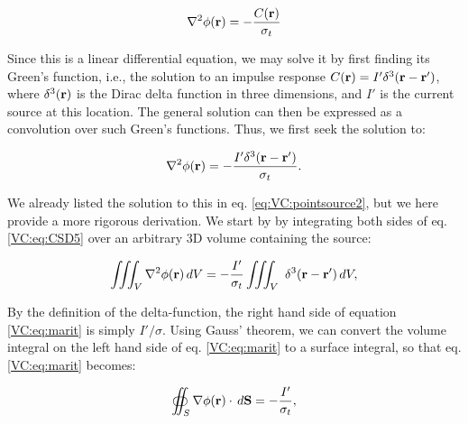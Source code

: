 \begin{equation}
\nabla^2 \phi({\bf r}) = - \frac{C({\bf r})}{\sigma_t}
\label{VC:eq:CSD4}
\end{equation}

Since this is a linear differential equation, we may solve it by first finding its Green's function, i.e., the solution to an impulse response $C({\bf r}) = I' \delta^3({\bf r-r'})$, 
where $\delta^3({\bf r})$ is the Dirac delta function in three dimensions, and $I'$ is the current source at this location. The general solution can then be expressed as a convolution over such Green's functions. Thus, we first seek the solution to: 

\begin{equation}
\nabla^2 \phi({\bf r}) = - \frac{I' \delta^3({\bf r-r'})}{\sigma_t}.
\label{VC:eq:CSD5}
\end{equation}

We already listed the solution to this in eq. \ref{eq:VC:pointsource2}, but we here provide a more rigorous derivation. We start by by integrating both sides of eq. \ref{VC:eq:CSD5} over an arbitrary 3D volume containing the source:

\begin{equation}
\iiint_V \nabla^2\phi({\bf r}) \,dV =  - \frac{I'}{\sigma_t} \iiint_V \ \delta^3({\bf r-r'}) \, dV,
\label{VC:eq:marit}
\end{equation}

By the definition of the delta-function, the right hand side of equation \ref{VC:eq:marit} is simply $I'/\sigma$. Using Gauss' theorem, we can convert the volume integral on the left hand side of eq. \ref{VC:eq:marit} to a surface integral, so that eq. \ref{VC:eq:marit} becomes:

\begin{equation}
\oiint_{S} \nabla\phi({\bf r}) \cdot \, d{\bf S}  = - \frac{I'}{\sigma_t},
\label{VC:eq:berit1}
\end{equation}


